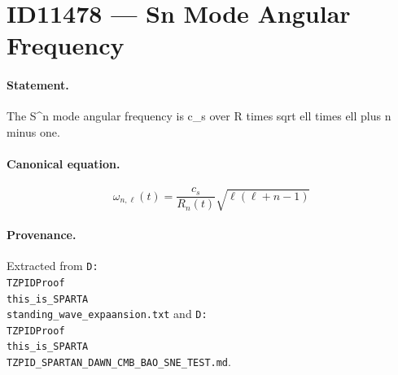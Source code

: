 \section*{ID11478 --- Sn Mode Angular Frequency}

\paragraph{Statement.}
The S^n mode angular frequency is c_s over R times sqrt ell times ell plus n minus one.

\paragraph{Canonical equation.}
\[
\omega_{n,\ell}(t)=\frac{c_s}{R_n(t)}\sqrt{\ell(\ell+n-1)}
\]

\paragraph{Provenance.}
Extracted from \texttt{D:\\TZPIDProof\\this\_is\_SPARTA\\standing\_wave\_expaansion.txt} and \texttt{D:\\TZPIDProof\\this\_is\_SPARTA\\TZPID\_SPARTAN\_DAWN\_CMB\_BAO\_SNE\_TEST.md}.
